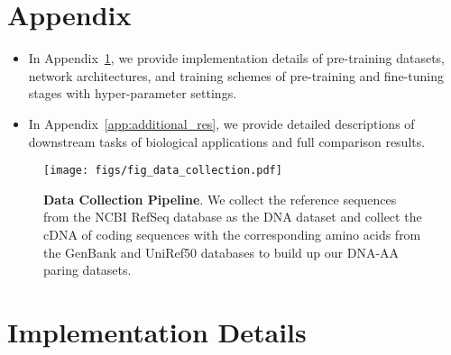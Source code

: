 
\renewcommand\thefigure{A\arabic{figure}}
\renewcommand\thetable{A\arabic{table}}
\setcounter{table}{0}
\setcounter{figure}{0}

\appendix

\newpage
\onecolumn

\section*{Appendix}
\begin{itemize}[leftmargin=1.25em]
    \vspace{-0.5em}
    \item In Appendix~\ref{app:implement}, we provide implementation details of pre-training datasets, network architectures, and training schemes of pre-training and fine-tuning stages with hyper-parameter settings.
    \vspace{-0.5em}
    \item In Appendix~\ref{app:additional_res}, we provide detailed descriptions of downstream tasks of biological applications and full comparison results.
\end{itemize}


\begin{figure}[ht]
    \centering
    \texttt{[image: figs/fig\_data\_collection.pdf]}
    \caption{\textbf{Data Collection Pipeline}. We collect the reference sequences from the NCBI RefSeq database as the DNA dataset and collect the cDNA of coding sequences with the corresponding amino acids from the GenBank and UniRef50 databases to build up our DNA-AA paring datasets.
    }
    \label{fig:data_collection}
    \vspace{-1.0em}
\end{figure}


\section{Implementation Details}
\label{app:implement}


